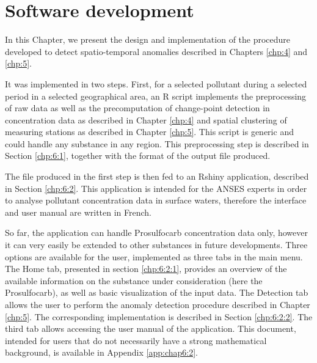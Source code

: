 \chapter{Software development}\label{chp:6}

\minitoc

\clearpage


In this Chapter, we present the design and implementation of the procedure developed to detect spatio-temporal anomalies described in Chapters \ref{chp:4} and \ref{chp:5}.

It was implemented in two steps. First, for a selected pollutant during a selected period in a selected geographical area, an R script implements the preprocessing of raw data as well as the precomputation of change-point detection in concentration data as described in Chapter \ref{chp:4} and spatial clustering of measuring stations as described in Chapter \ref{chp:5}. This script is generic and could handle any substance in any region. This preprocessing step is described in Section \ref{chp:6:1}, together with the format of the output file produced.

The file produced in the first step is then fed to an Rshiny application, described in Section \ref{chp:6:2}. This application is intended for the ANSES experts in order to analyse pollutant concentration data in surface waters, therefore the interface and user manual are written in French. 

So far, the application can handle Prosulfocarb concentration data only, however it can very easily be extended to other substances in future developments. Three options are available for the user, implemented as three tabs in the main menu. The Home tab, presented in section \ref{chp:6:2:1}, provides an overview of the available information on the substance under consideration (here the Prosulfocarb), as well as basic visualization of the input data. The Detection tab allows the user to perform the anomaly detection procedure described in Chapter \ref{chp:5}. The corresponding implementation is described in Section \ref{chp:6:2:2}. The third tab allows accessing the user manual of the application. This document, intended for users that do not necessarily have a strong mathematical background, is available in Appendix \ref{app:chap6:2}. 


